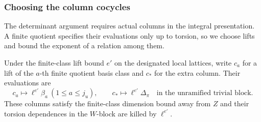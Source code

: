 \subsubsection*{Choosing the column cocycles}

The determinant argument requires actual columns in the integral presentation. A finite quotient specifies their evaluations only up to torsion, so we choose lifts and bound the exponent of a relation among them.

\begin{lemma}
\label{lem:congruence-column-cocycles}
Under the finite-class lift bound \(e'\) on the designated local
lattices, write \(c_a\) for a lift of the \(a\)-th finite quotient basis class and \(c_*\) for the extra column. Their evaluations are
\[
 c_a\longmapsto\ell^{e'}\beta_a\ (1\le a\le j_u),\qquad c_*\longmapsto\ell^{e'}\Delta_\pi\quad\text{in the unramified trivial block}.
\] These columns
satisfy the finite-class dimension bound away from \(Z\) and their
torsion dependences in the \(W\)-block are killed by \(\ell^{e'}\).
\end{lemma}

